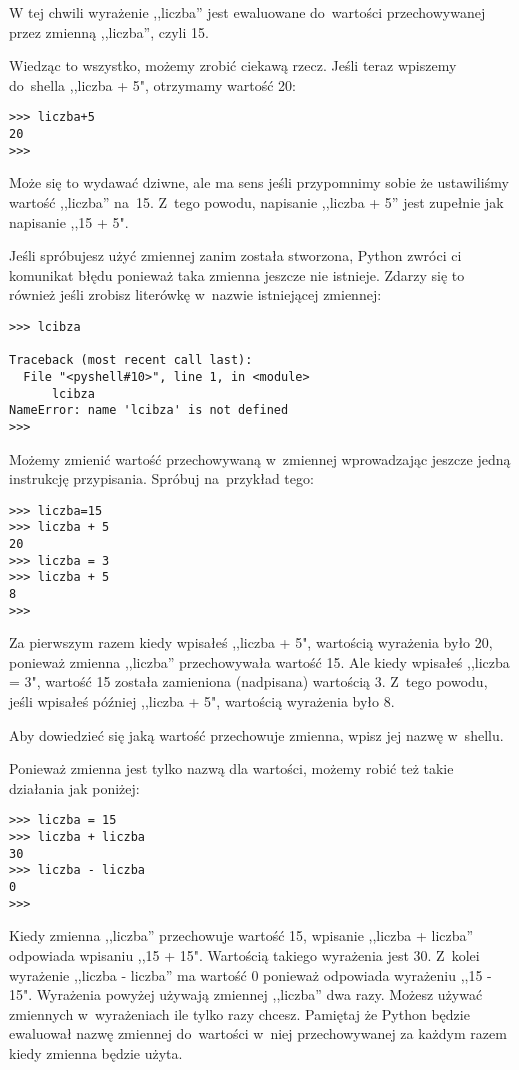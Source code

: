\documentclass{book}
\begin{document}
W tej chwili wyrażenie ,,liczba'' jest ewaluowane do~wartości przechowywanej przez zmienną ,,liczba'', czyli 15.

Wiedząc to wszystko, możemy zrobić ciekawą rzecz. Jeśli teraz wpiszemy do~shella ,,liczba + 5", otrzymamy wartość 20:

\begin{lstlisting}
>>> liczba+5
20
>>> 
\end{lstlisting}

Może się to wydawać dziwne, ale ma sens jeśli przypomnimy sobie że ustawiliśmy wartość ,,liczba'' na~15. Z~tego powodu, napisanie ,,liczba + 5'' jest zupełnie jak napisanie ,,15 + 5".

Jeśli spróbujesz użyć zmiennej zanim została stworzona, Python zwróci ci komunikat błędu ponieważ taka zmienna jeszcze nie istnieje. Zdarzy się to również jeśli zrobisz literówkę w~nazwie istniejącej zmiennej:


\begin{lstlisting}
>>> lcibza

Traceback (most recent call last):
  File "<pyshell#10>", line 1, in <module>
      lcibza
NameError: name 'lcibza' is not defined
>>> 
\end{lstlisting}

Możemy zmienić wartość przechowywaną w~zmiennej wprowadzając jeszcze jedną instrukcję przypisania. Spróbuj na~przykład tego:

\begin{lstlisting}
>>> liczba=15
>>> liczba + 5
20
>>> liczba = 3
>>> liczba + 5
8
>>> 
\end{lstlisting}

Za pierwszym razem kiedy wpisałeś ,,liczba + 5", wartością wyrażenia było 20, ponieważ zmienna ,,liczba'' przechowywała wartość 15. Ale kiedy wpisałeś ,,liczba = 3", wartość 15 została zamieniona (nadpisana) wartością 3. Z~tego powodu, jeśli wpisałeś później ,,liczba + 5", wartością wyrażenia było 8.

Aby dowiedzieć się jaką wartość przechowuje zmienna, wpisz jej nazwę w~shellu.

Ponieważ zmienna jest tylko nazwą dla wartości, możemy robić też takie działania jak poniżej:

\begin{lstlisting}
>>> liczba = 15
>>> liczba + liczba
30
>>> liczba - liczba
0
>>> 
\end{lstlisting}

Kiedy zmienna ,,liczba'' przechowuje wartość 15, wpisanie ,,liczba + liczba'' odpowiada wpisaniu ,,15 + 15". Wartością takiego wyrażenia jest 30. Z~kolei wyrażenie ,,liczba - liczba'' ma wartość 0 ponieważ odpowiada wyrażeniu ,,15 - 15". Wyrażenia powyżej używają zmiennej ,,liczba'' dwa razy. Możesz używać zmiennych w~wyrażeniach ile tylko razy chcesz. Pamiętaj że Python będzie ewaluował nazwę zmiennej do~wartości w~niej przechowywanej za każdym razem kiedy zmienna będzie użyta.
\end{document}
